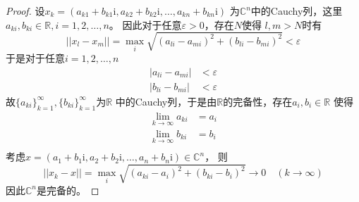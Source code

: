 \documentclass[cn]{homework}
\begin{document}
    \problem
    \newcommand{\img}{\mathrm i}
    \begin{proof}
        设$x_k=(a_{k1}+b_{k1}\img,a_{k2}+b_{k2}\img,\ldots,a_{kn}+b_{kn}\img)$
        为$\mathbb C^n$中的Cauchy列，这里$a_{ki},b_{ki}\in\mathbb R,i=1,2,\ldots,n$。
        因此对于任意$\varepsilon>0$，存在$N$使得
        $l,m>N$时有
        \[||x_l-x_m||=\max_i\sqrt{(a_{li}-a_{mi})^2+(b_{li}-b_{mi})^2}
        <\varepsilon\]
        于是对于任意$i=1,2,\ldots,n$
        \[\begin{aligned}
            |a_{li}-a_{mi}|&<\varepsilon\\
            |b_{li}-b_{mi}|&<\varepsilon
        \end{aligned}\]
        故$\{a_{ki}\}^\infty_{k=1},\{b_{ki}\}^\infty_{k=1}$为$\mathbb R$
        中的Cauchy列，于是由$\mathbb R$的完备性，存在$a_i,b_i\in\mathbb R$
        使得
        \[\begin{aligned}
            \lim_{k\to\infty}a_{ki}&=a_i\\
            \lim_{k\to\infty}b_{ki}&=b_i\\
        \end{aligned}\]
        考虑$x=(a_1+b_1\img,a_2+b_2\img,\ldots,a_n+b_n\img)\in\mathbb C^n$，
        则
        \[||x_k-x||=\max_i\sqrt{(a_{ki}-a_i)^2+(b_{ki}-b_i)^2}
        \to 0\quad(k\to\infty)\]
        因此$\mathbb C^n$是完备的。
    \end{proof}
\end{document}
